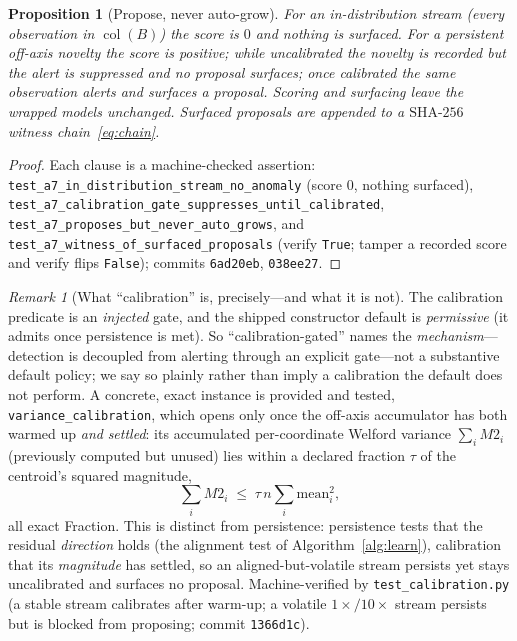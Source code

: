 \documentclass[11pt]{article}
\theoremstyle{plain}
\newtheorem{proposition}[theorem]{Proposition}
\theoremstyle{definition}
\theoremstyle{remark}
\newtheorem{remark}[theorem]{Remark}
\newcommand{\BB}{B}
\DeclareMathOperator{\col}{col}
\begin{document}
\begin{proposition}[Propose, never auto-grow]\label{prop:detector}
For an in-distribution stream (every observation in $\col(\BB)$) the score is $0$ and nothing is surfaced.
For a persistent off-axis novelty the score is positive; while uncalibrated the novelty is recorded but the
alert is \emph{suppressed} and no proposal surfaces; once calibrated the same observation alerts and surfaces
a proposal. Scoring and surfacing leave the wrapped models unchanged. Surfaced proposals are appended to a
$\mathrm{SHA}\text{-}256$ witness chain~\eqref{eq:chain}.
\end{proposition}
\begin{proof}
Each clause is a machine-checked assertion:
\texttt{test\_a7\_in\_distribution\_stream\_no\_anomaly} (score $0$, nothing surfaced),
\texttt{test\_a7\_calibration\_gate\_suppresses\_until\_calibrated},
\texttt{test\_a7\_proposes\_but\_never\_auto\_grows}, and
\texttt{test\_a7\_witness\_of\_surfaced\_proposals} (verify \texttt{True}; tamper a recorded score and verify
flips \texttt{False}); commits \texttt{6ad20eb}, \texttt{038ee27}.
\end{proof}

\begin{remark}[What ``calibration'' is, precisely---and what it is not]\label{rem:calibration}
The calibration predicate is an \emph{injected} gate, and the shipped constructor default is \emph{permissive}
(it admits once persistence is met). So ``calibration-gated'' names the \emph{mechanism}---detection is
decoupled from alerting through an explicit gate---not a substantive default policy; we say so plainly rather
than imply a calibration the default does not perform. A concrete, exact instance is provided and tested,
\texttt{variance\_calibration}, which opens only once the off-axis accumulator has both warmed up \emph{and}
\emph{settled}: its accumulated per-coordinate Welford variance $\sum_i M2_i$ (previously computed but unused)
lies within a declared fraction $\tau$ of the centroid's squared magnitude,
\begin{equation}\label{eq:calib}
  \textstyle\sum_i M2_i \;\le\; \tau\,n\sum_i \mathrm{mean}_i^2 ,
\end{equation}
all exact Fraction. This is distinct from persistence: persistence tests that the residual \emph{direction}
holds (the alignment test of Algorithm~\ref{alg:learn}), calibration that its \emph{magnitude} has settled, so
an aligned-but-volatile stream persists yet stays uncalibrated and surfaces no proposal. Machine-verified by
\texttt{test\_calibration.py} (a stable stream calibrates after warm-up; a volatile $1{\times}/10{\times}$
stream persists but is blocked from proposing; commit \texttt{1366d1c}).
\end{remark}
\end{document}
